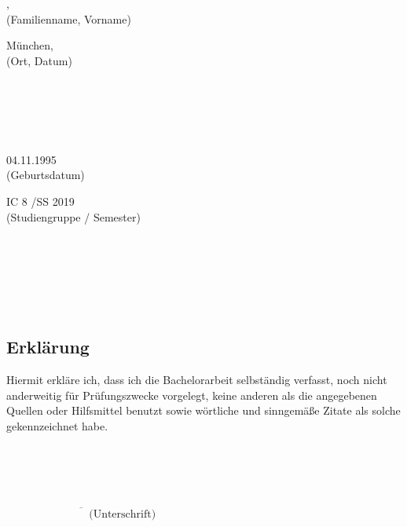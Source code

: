 \thispagestyle{empty}
\mbox{}
\newpage
\thispagestyle{empty}
\begin{minipage}[b]{0.5\textwidth} 
\myname , \myvname \\
(Familienname, Vorname)
\end{minipage}
	\hfill
\begin{minipage}[b]{0.5\textwidth}
\begin{flushright}
München, \mydate \\
(Ort, Datum)
\end{flushright}
\end{minipage}
\\\\\\\\
\begin{minipage}[b]{0.5\textwidth} 
04.11.1995 \\
(Geburtsdatum)
\end{minipage}
	\hfill
\begin{minipage}[b]{0.5\textwidth}
\begin{flushright}
IC 8 /SS 2019 \\
(Studiengruppe / Semester)
\end{flushright}
\end{minipage}
\\ \\ \\ \\ \\
\subsection*{\centering Erklärung}
Hiermit erkläre ich, dass ich die Bachelorarbeit selbständig verfasst, noch nicht anderweitig für Prüfungszwecke vorgelegt, keine anderen als die angegebenen Quellen oder Hilfsmittel benutzt sowie wörtliche und sinngemäße Zitate als solche gekennzeichnet habe.\\\\\\\\\\
\begin{flushright}
$\overline{~~~~~~~~~~~~~~~~~~~~~~~~~~~~~~~~~~\mbox{(Unterschrift)}}$
\end{flushright}